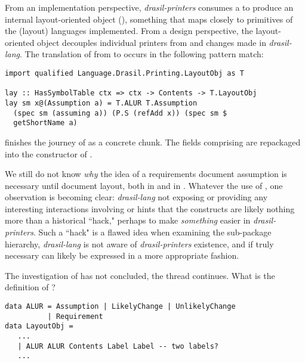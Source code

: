 From an implementation perspective, \textit{drasil-printers} consumes a  to produce an internal layout-oriented object (), something that maps closely to primitives of the (layout) languages implemented. From a design perspective, the layout-oriented object decouples individual printers from  and changes made in \textit{drasil-lang}. The translation of  from  to  occurs in the following pattern match:

\begin{tcolorbox}
\begin{verbatim}
import qualified Language.Drasil.Printing.LayoutObj as T

lay :: HasSymbolTable ctx => ctx -> Contents -> T.LayoutObj
lay sm x@(Assumption a) = T.ALUR T.Assumption
  (spec sm (assuming a)) (P.S (refAdd x)) (spec sm $
  getShortName a)
\end{verbatim}
\end{tcolorbox}

 finishes the journey of  as a concrete chunk. The fields comprising  are repackaged into the  constructor of . 

We still do not know \textit{why} the idea of a requirements document assumption is necessary until document layout, both in  and in . Whatever the use of , one observation is becoming clear: \textit{drasil-lang} not exposing or providing any interesting interactions involving  or  hints that the constructs are likely nothing more than a historical ``hack," perhaps to make \textit{something} easier in \textit{drasil-printers}. Such a ``hack" is a flawed idea when examining the sub-package hierarchy, \textit{drasil-lang} is not aware of \textit{drasil-printers} existence, and if truly necessary can likely be expressed in a more appropriate fashion.

The investigation of  has not concluded, the thread continues. What is the definition of ?

\begin{tcolorbox}
\begin{verbatim}
data ALUR = Assumption | LikelyChange | UnlikelyChange
          | Requirement
data LayoutObj =
   ...
   | ALUR ALUR Contents Label Label -- two labels?
   ...
\end{verbatim}
\end{tcolorbox}

